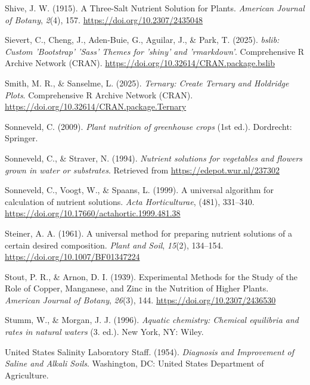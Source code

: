 \documentclass[
  letterpaper,
  DIV=11,
  numbers=noendperiod]{scrreprt}
\newlength{\cslhangindent}
\newenvironment{CSLReferences}[2] %
 {\begin{list}{}{%
  \setlength{\itemindent}{0pt}
  \setlength{\leftmargin}{0pt}
  \setlength{\parsep}{0pt}
  \ifodd #1
   \setlength{\leftmargin}{\cslhangindent}
   \setlength{\itemindent}{-1\cslhangindent}
  \fi
  \setlength{\itemsep}{#2\baselineskip}}}
 {\end{list}}
\begin{document}
\begin{CSLReferences}{1}{0}
Shive, J. W. (1915). {A Three-Salt Nutrient Solution for Plants}.
\emph{{American Journal of Botany}}, \emph{2}(4), 157.
\url{https://doi.org/10.2307/2435048}

Sievert, C., Cheng, J., Aden-Buie, G., Aguilar, J., \& Park, T. (2025).
\emph{{bslib: Custom 'Bootstrap' 'Sass' Themes for 'shiny' and
'rmarkdown'}}. {Comprehensive R Archive Network (CRAN)}.
\url{https://doi.org/10.32614/CRAN.package.bslib}

Smith, M. R., \& Sanselme, L. (2025). \emph{{Ternary: Create Ternary and
Holdridge Plots}}. {Comprehensive R Archive Network (CRAN)}.
\url{https://doi.org/10.32614/CRAN.package.Ternary}

Sonneveld, C. (2009). \emph{{Plant nutrition of greenhouse crops}} (1st
ed.). Dordrecht: Springer.

Sonneveld, C., \& Straver, N. (1994). \emph{{Nutrient solutions for
vegetables and flowers grown in water or substrates}}. Retrieved from
\url{https://edepot.wur.nl/237302}

Sonneveld, C., Voogt, W., \& Spaans, L. (1999). {A universal algorithm
for calculation of nutrient solutions}. \emph{{Acta Horticulturae}},
(481), 331--340. \url{https://doi.org/10.17660/actahortic.1999.481.38}

Steiner, A. A. (1961). {A universal method for preparing nutrient
solutions of a certain desired composition}. \emph{{Plant and Soil}},
\emph{15}(2), 134--154. \url{https://doi.org/10.1007/BF01347224}

Stout, P. R., \& Arnon, D. I. (1939). {Experimental Methods for the
Study of the Role of Copper, Manganese, and Zinc in the Nutrition of
Higher Plants}. \emph{{American Journal of Botany}}, \emph{26}(3), 144.
\url{https://doi.org/10.2307/2436530}

Stumm, W., \& Morgan, J. J. (1996). \emph{{Aquatic chemistry: Chemical
equilibria and rates in natural waters}} (3. ed.). New York, NY: Wiley.

United States Salinity Laboratory Staff. (1954). \emph{{Diagnosis and
Improvement of Saline and Alkali Soils}}. Washington, DC: {United States
Department of Agriculture}.


\end{CSLReferences}
\end{document}
